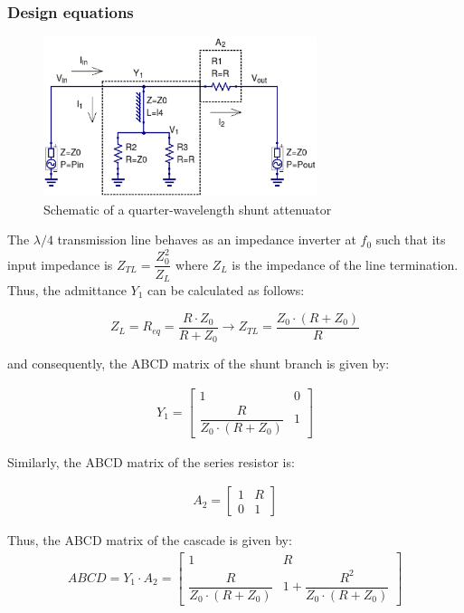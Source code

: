 \subsubsection{Design equations}
\begin{figure}[ht]
\begin{center}
\includegraphics[width=8cm]{bitmaps/synthesis/attenuators/QW-Shunt-Attenuator-Schematic}
\end{center}
\caption{Schematic of a quarter-wavelength shunt attenuator}
\label{fig:qw-shunt-att-schematic}
\end{figure}
\FloatBarrier


\noindent The $\lambda/4$ transmission line behaves as an impedance inverter at $f_0$ such that its input impedance is $Z_{TL} = \dfrac{Z_0^2}{Z_L} $ where $Z_L$ is the impedance of the line termination. Thus, the admittance $Y_1$ can be calculated as follows:

\begin{equation}
Z_L = R_{eq} = \dfrac{R \cdot Z_0}{ R + Z_0} \rightarrow Z_{TL} = \dfrac{Z_0 \cdot (R + Z_0)}{R}
\end{equation}

\noindent and consequently, the ABCD matrix of the shunt branch is given by:

\begin{gather}
 Y_{1} = 
 \begin{bmatrix} 1 & 0 \\ \dfrac{R}{Z_0 \cdot (R + Z_0)} & 1 \end{bmatrix}
\end{gather}

\noindent Similarly, the ABCD matrix of the series resistor is:

\begin{gather}
 A_{2} = 
 \begin{bmatrix} 1 & R \\ 0 & 1 \end{bmatrix}
\end{gather}

\noindent Thus, the ABCD matrix of the cascade is given by:
\begin{gather}
 ABCD = Y_{1} \cdot A_{2} = \begin{bmatrix} 1 & R \\ \dfrac{R}{Z_0 \cdot (R + Z_0)} & 1 + \dfrac{R^2}{Z_0 \cdot (R + Z_0)} \end{bmatrix}
\end{gather}

